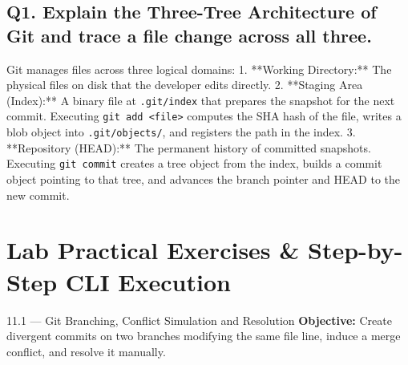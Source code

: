 \subsection*{Q1. Explain the Three-Tree Architecture of Git and trace a file change across all three.}
\begin{vivasol}
Git manages files across three logical domains:
1. **Working Directory:** The physical files on disk that the developer edits directly.
2. **Staging Area (Index):** A binary file at \texttt{.git/index} that prepares the snapshot for the next commit. Executing \texttt{git add <file>} computes the SHA hash of the file, writes a blob object into \texttt{.git/objects/}, and registers the path in the index.
3. **Repository (HEAD):** The permanent history of committed snapshots. Executing \texttt{git commit} creates a tree object from the index, builds a commit object pointing to that tree, and advances the branch pointer and HEAD to the new commit.
\end{vivasol}

\section{Lab Practical Exercises \& Step-by-Step CLI Execution}

\begin{practicalbox}{11.1 --- Git Branching, Conflict Simulation and Resolution}
\textbf{Objective:} Create divergent commits on two branches modifying the same file line, induce a merge conflict, and resolve it manually.
\end{practicalbox}

